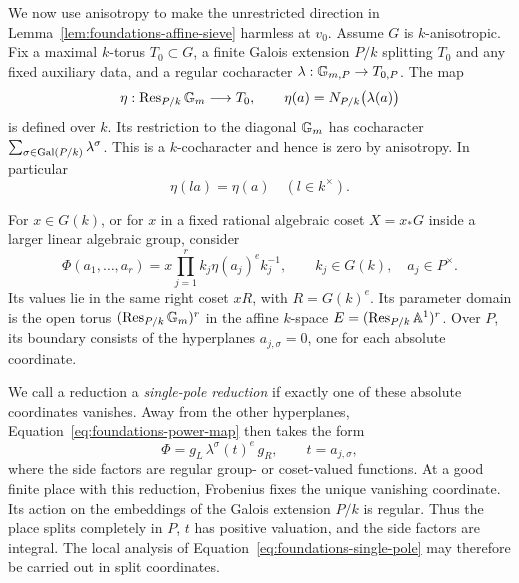 We now use anisotropy to make the unrestricted direction in
Lemma~\ref{lem:foundations-affine-sieve} harmless at \(v_0\).
Assume \(G\) is \(k\)-anisotropic.  Fix a maximal \(k\)-torus
\(T_0\subset G\), a finite Galois extension \(P/k\) splitting \(T_0\)
and any fixed auxiliary data, and a regular cocharacter
\(\lambda:\mathbb G_{m,P}\to T_{0,P}\).
The map
\begin{equation}\label{eq:foundations-eta}
 \eta:\operatorname{Res}_{P/k}\mathbb G_m\longrightarrow T_0,\qquad
 \eta(a)=N_{P/k}\bigl(\lambda(a)\bigr)
\end{equation}
is defined over \(k\).  Its restriction to the diagonal \(\mathbb G_m\)
has cocharacter \(\sum_{\sigma\in\operatorname{Gal}(P/k)}\lambda^\sigma\).
This is a \(k\)-cocharacter and hence is zero by anisotropy.
In particular
\begin{equation}\label{eq:foundations-scalar-invariance}
                         \eta(la)=\eta(a)\quad(l\in k^\times).
\end{equation}

For \(x\in G(k)\), or for \(x\) in a fixed rational algebraic
coset \(X=x_*G\) inside a larger linear algebraic group, consider
\begin{equation}\label{eq:foundations-power-map}
 \Phi(a_1,\ldots,a_r)
       =x\prod_{j=1}^r k_j\eta(a_j)^e k_j^{-1},
       \qquad k_j\in G(k),\quad a_j\in P^\times .
\end{equation}
Its values lie in the same right coset \(xR\), with
\(R=G(k)^e\).  Its parameter domain is the open torus
\((\operatorname{Res}_{P/k}\mathbb G_m)^r\) in the affine \(k\)-space
\(E=(\operatorname{Res}_{P/k}\mathbb A^1)^r\).
Over \(P\), its boundary consists of the hyperplanes
\(a_{j,\sigma}=0\), one for each absolute coordinate.

We call a reduction a \emph{single-pole reduction} if exactly one
of these absolute coordinates vanishes.  Away from the other
hyperplanes, Equation~\ref{eq:foundations-power-map} then takes the
form
\begin{equation}\label{eq:foundations-single-pole}
             \Phi=g_L\,\lambda^\sigma(t)^e\,g_R,
                    \qquad t=a_{j,\sigma},
\end{equation}
where the side factors are regular group- or coset-valued functions.
At a good finite place with this reduction, Frobenius fixes the unique
vanishing coordinate.  Its action on the embeddings of the Galois
extension \(P/k\) is regular.  Thus the place splits completely in
\(P\), \(t\) has positive valuation, and the side factors are integral.
The local analysis of Equation~\ref{eq:foundations-single-pole} may
therefore be carried out in split coordinates.

